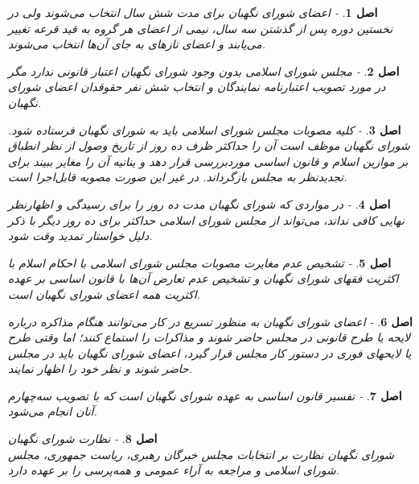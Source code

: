 \documentclass[12pt]{article}
\newtheorem{asl}{اصل}
\begin{document}
\begin{asl}- 
اعضای شورای نگهبان برای مدت شش سال انتخاب می‏‌شوند ولی در نخستین دوره پس از گذشتن سه سال، نیمی از اعضای هر گروه به قید قرعه تغییر می‌یابند و اعضای تازه‏ای به جای آن‌ها انتخاب می‌شوند.  
\end{asl}

\begin{asl}- 
مجلس شورای اسلامی بدون وجود شورای نگهبان اعتبار قانونی ندارد مگر در مورد تصویب اعتبارنامه نمایندگان و انتخاب شش نفر حقوقدان اعضای شورای نگهبان. 
\end{asl}

\begin{asl}- 
کلیه مصوبات مجلس شورای اسلامی باید به شورای نگهبان فرستاده شود. شورای نگهبان موظف است آن را حداکثر ظرف ده روز از تاریخ وصول از نظر انطباق بر موازین اسلام و قانون اساسی موردبررسی قرار دهد و ینانیه آن را مغایر ببیند برای تجدیدنظر به مجلس بازگرداند. در غیر این صورت مصوبه قابل‌اجرا است. 
\end{asl}

\begin{asl}- 
در مواردی که شورای نگهبان مدت ده روز را برای رسیدگی و اظهارنظر نهایی کافی نداند، می‌تواند از مجلس شورای اسلامی حداکثر برای ده روز دیگر با ذکر دلیل خواستار تمدید وقت شود. 
\end{asl}

\begin{asl}- 
تشخیص عدم مغایرت مصوبات مجلس شورای اسلامی با احکام اسلام با اکثریت فقهای شورای نگهبان و تشخیص عدم تعارض آن‌ها با قانون اساسی بر عهده اکثریت همه اعضای شورای نگهبان است. 
\end{asl}

\begin{asl}- 
اعضای شورای نگهبان به منظور تسریع در کار می‌توانند هنگام مذاکره درباره لایحه یا طرح قانونی در مجلس حاضر شوند و مذاکرات را استماع کنند؛ اما وقتی طرح یا لایحه‏ای فوری در دستور کار مجلس قرار گیرد، اعضای شورای نگهبان باید در مجلس حاضر شوند و نظر خود را اظهار نمایند. 
\end{asl}

\begin{asl}- 
تفسیر قانون اساسی به عهده شورای نگهبان است که با تصویب سه‌چهارم آنان انجام می‌شود. 
\end{asl}

\begin{asl}- 
نظارت شورای نگهبان 
\\
شورای نگهبان نظارت بر انتخابات مجلس خبرگان رهبری، ریاست جمهوری، مجلس شورای اسلامی و مراجعه به آراء عمومی و همه‌‏پرسی را بر عهده دارد. 
\end{asl}
\end{document}
